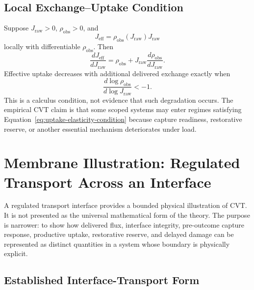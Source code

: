\documentclass[11pt]{article}
\begin{document}
\subsection{Local Exchange--Uptake Condition}

Suppose \(J_{\mathrm{raw}}>0\), \(\rho_{\mathrm{obs}}>0\), and
\[
    J_{\mathrm{eff}}
    =
    \rho_{\mathrm{obs}}(J_{\mathrm{raw}})J_{\mathrm{raw}}
\]
locally with differentiable \(\rho_{\mathrm{obs}}\). Then
\begin{equation}
    \frac{dJ_{\mathrm{eff}}}{dJ_{\mathrm{raw}}}
    =
    \rho_{\mathrm{obs}}
    +
    J_{\mathrm{raw}}
    \frac{d\rho_{\mathrm{obs}}}{dJ_{\mathrm{raw}}}.
    \label{eq:exchange-uptake-derivative}
\end{equation}
Effective uptake decreases with additional delivered exchange exactly when
\begin{equation}
    \frac{d\log\rho_{\mathrm{obs}}}{d\log J_{\mathrm{raw}}}
    <
    -1.
    \label{eq:uptake-elasticity-condition}
\end{equation}
This is a calculus condition, not evidence that such degradation occurs. The empirical CVT claim is that some scoped systems may enter regimes satisfying Equation~\eqref{eq:uptake-elasticity-condition} because capture readiness, restorative reserve, or another essential mechanism deteriorates under load.

\section{Membrane Illustration: Regulated Transport Across an Interface}
\label{sec:membrane}

A regulated transport interface provides a bounded physical illustration of CVT. It is not presented as the universal mathematical form of the theory. The purpose is narrower: to show how delivered flux, interface integrity, pre-outcome capture response, productive uptake, restorative reserve, and delayed damage can be represented as distinct quantities in a system whose boundary is physically explicit.

\subsection{Established Interface-Transport Form}
\end{document}
